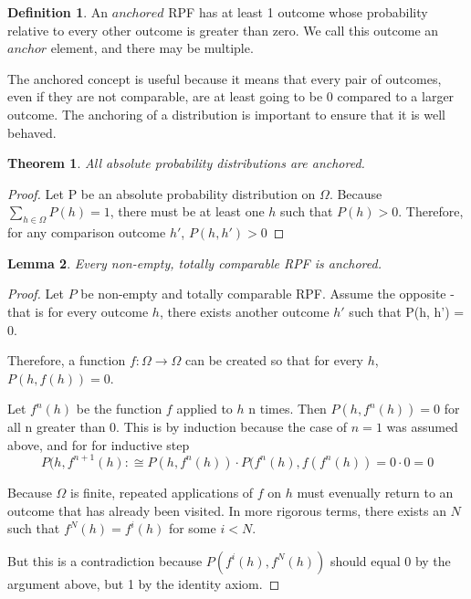 \documentclass[twoside]{article}
\theoremstyle{plain}%
\newtheorem{theorem}{Theorem}[section]
\newtheorem{lemma}[theorem]{Lemma}
\theoremstyle{definition}
\newtheorem{definition}{Definition}[section]
\theoremstyle{remark}
\begin{document}
\begin{definition}
\label{def:anchored_rpf}
An \(anchored\) RPF has at least 1 outcome whose probability relative to every other outcome is greater than zero. We call this outcome an \(anchor\) element, and there may be multiple.
\end{definition}

The anchored concept is useful because it means that every pair of outcomes, even if they are not comparable, are at least going to be 0 compared to a larger outcome. The anchoring of a distribution is important to ensure that it is well behaved.

\begin{theorem}
\label{thm:absolute_anchored}
All absolute probability distributions are anchored.
\end{theorem}

\begin{proof}
Let P be an absolute probability distribution on \(\Omega\). Because \(\sum_{h \in \Omega} P(h) = 1\), there must be at least one \(h\) such that \(P(h) > 0\).  Therefore, for any comparison outcome \(h'\), \(P(h, h') > 0\)
\end{proof}

\begin{lemma}
\label{lemma:totally_comp_anchored}
Every non-empty, totally comparable RPF is anchored.
\end{lemma}

\begin{proof}
Let \(P\) be non-empty and totally comparable RPF. Assume the opposite - that is for every outcome \(h\), there exists another outcome \(h'\) such that P(h, h') = 0.

Therefore, a function \(f: \Omega \rightarrow \Omega\) can be created so that for every \(h\), \(P(h, f(h)) = 0\).

Let \(f^n(h)\) be the function \(f\) applied to \(h\) n times. Then \(P(h, f^n(h)) = 0\) for all n greater than 0. This is by induction because the case of \(n = 1\) was assumed above, and for for inductive step\[P(h, f^{n+1}(h) :\cong P(h, f^n(h)) \cdot P(f^n(h), f(f^n(h)) = 0 \cdot 0 = 0\]

Because \(\Omega\) is finite, repeated applications of \(f\) on \(h\) must evenually return to an outcome that has already been visited. In more rigorous terms, there exists an \(N\) such that \(f^N(h) = f^i(h)\) for some \(i < N\).

But this is a contradiction because \(P(f^i(h), f^N(h))\) should equal 0 by the argument above, but 1 by the identity axiom.
\end{proof}
\end{document}
